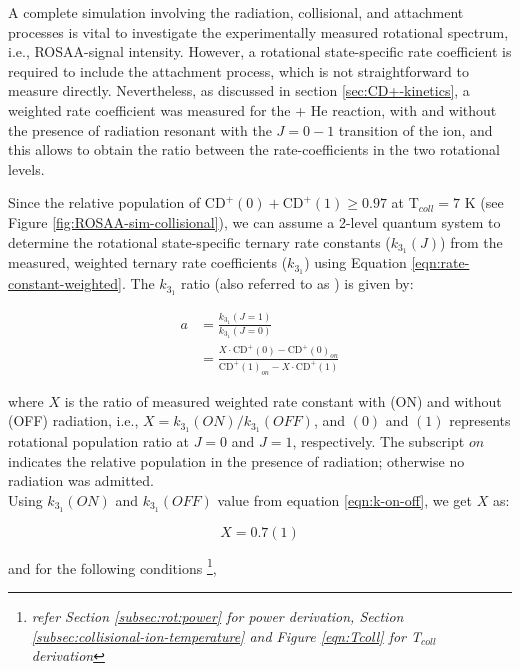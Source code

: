 A complete simulation involving the radiation, collisional, and attachment
processes is vital to investigate the experimentally measured rotational
spectrum, i.e., ROSAA-signal intensity. However, a rotational state-specific
rate coefficient is required to include the attachment process, which is not
straightforward to measure directly. Nevertheless, as discussed in section
\ref{sec:CD+-kinetics}, a weighted rate coefficient was measured for the \CD + He 
reaction, with and without the presence of radiation resonant with
the $J=0-1$ transition of the \CD ion, and this allows to obtain the ratio between the
rate-coefficients in the two rotational levels.

Since the relative population of ${\text{CD}^+}(0) + \text{CD}^+(1) \geq 0.97 $
at T$_{coll}=7$ K (see Figure \ref{fig:ROSAA-sim-collisional}), we can assume a
2-level quantum system to determine the rotational state-specific ternary rate
constants ($k_{3_1}(J)$) from the measured, weighted ternary rate coefficients
($k_{3_1}$) using Equation \ref{eqn:rate-constant-weighted}. The $k_{3_1}$
ratio (also referred to as ) is given by:

\begin{equation}
    \begin{split}
        a & = \frac{k_{3_1}(J=1)}{k_{3_1}(J=0)}\\
        & = \frac{X \cdot \text{CD}^+(0) - \text{CD}^+(0)_{on}}{\text{CD}^+(1)_{on} - X\cdot \text{CD}^+(1)}
    \end{split}
    \label{eqns:rate-constant-change-ratio}
\end{equation}

where $X$ is the ratio of measured weighted rate constant with (ON) and without
(OFF) radiation, i.e., $X=k_{3_1}(ON) / k_{3_1}(OFF)$, and \CD$(0)$ and \CD$(1)$
represents \CD rotational population ratio at $J=0$ and $J=1$, respectively.
The subscript $on$ indicates the relative population in the presence of
radiation; otherwise no radiation was admitted.\\

Using $k_{3_1}(ON)$ and $k_{3_1}(OFF)$ value from equation \ref{eqn:k-on-off},
we get $X$ as:

\begin{equation}
    X = 0.7(1)
    \label{eqn:derived-X-value}
\end{equation}

and for the following conditions \footnote{\textit{refer Section
        \ref{subsec:rot:power} for power derivation, Section
        \ref{subsec:collisional-ion-temperature} and Figure \ref{eqn:Tcoll} for
        T$_{coll}$ derivation}},

